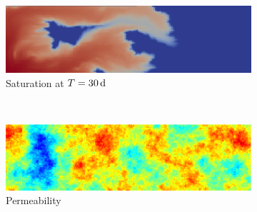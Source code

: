 \begin{figure}[ht]
\centering
\begin{subfigure}{0.49\textwidth}
\includegraphics[width=\textwidth]{figures/saturation_tarbert_layer-0.png}
\caption{Saturation at $T = \unit[30]{d}$}
\label{fig:saturation_tarbert_layer-0}
\end{subfigure}
~
\begin{subfigure}{0.49\textwidth}
\includegraphics[width=\textwidth]{figures/perm_tarbert_layer-0.png}
\caption{Permeability}
\label{fig:perm_tarbert_layer-0}
\end{subfigure}
\caption{}
\label{fig:tarbert_layer-0}
\end{figure}